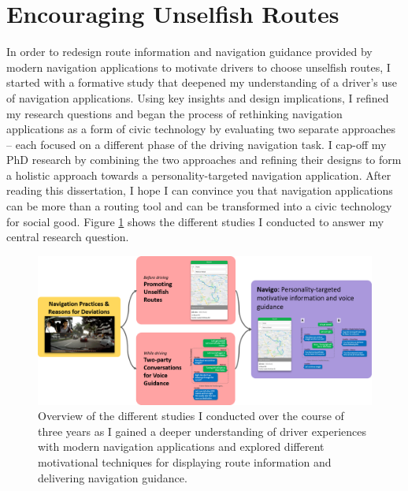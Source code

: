 \section{Encouraging Unselfish Routes}
In order to redesign route information and navigation guidance provided by modern navigation applications to motivate drivers to choose unselfish routes, I started with a formative study that deepened my understanding of a driver’s use of navigation applications. Using key insights and design implications, I refined my research questions and began the process of rethinking navigation applications as a form of civic technology by evaluating two separate approaches -- each focused on a different phase of the driving navigation task. I cap-off my PhD research by combining the two approaches and refining their designs to form a holistic approach towards a personality-targeted navigation application. After reading this dissertation, I hope I can convince you that navigation applications can be more than a routing tool and can be transformed into a civic technology for social good. Figure \ref{fig:overview} shows the different studies I conducted to answer my central research question.

\begin{figure}[t]
  \centering
  \includegraphics[scale=0.4]{figures/overview.png}
  \caption{Overview of the different studies I conducted over the course of three years as I gained a deeper understanding of driver experiences with modern navigation applications and explored different motivational techniques for displaying route information and delivering navigation guidance.}
  \label{fig:overview}
\end{figure}

